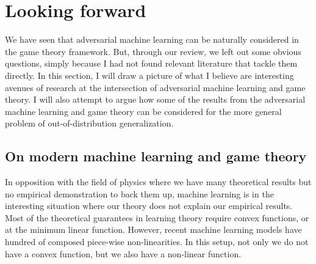 \section{Looking forward}
\label{sec-forward}
We have seen that adversarial machine learning can be naturally considered in the game theory framework. But, through our review, we left out some obvious questions, simply because I had not found relevant literature that tackle them directly. In this section, I will draw a picture of what I believe are interesting avenues of research at the intersection of adversarial machine learning and game theory. I will also attempt to argue how some of the results from the adversarial machine learning and game theory can be considered for the more general problem of out-of-distribution generalization.

\subsection{On modern machine learning and game theory}
In opposition with the field of physics where we have many theoretical results but no empirical demonstration to back them up, machine learning is in the interesting situation where our theory does not explain our empirical results. Most of the theoretical guarantees in learning theory require convex functions, or at the minimum linear function. However, recent machine learning models have hundred of composed piece-wise non-linearities. In this setup, not only we do not have a convex function, but we also have a non-linear function.

